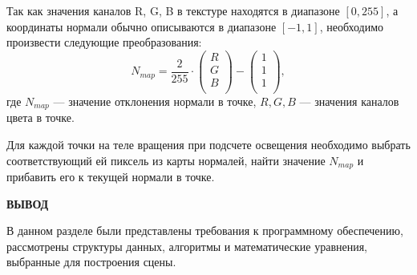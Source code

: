 Так как значения каналов R, G, B в текстуре находятся в диапазоне $[0, 255]$, а координаты нормали обычно описываются в диапазоне $[-1, 1]$, необходимо произвести следующие преобразования:
\begin{equation}
    N_{map} = \frac{2}{255} \cdot 
    \begin{pmatrix}
    R \\
    G \\
    B \\
    \end{pmatrix}
    - 
    \begin{pmatrix}
    1 \\
    1 \\
    1 \\
    \end{pmatrix},
\end{equation}
где $N_{map}$ --- значение отклонения нормали в точке, $R, G, B$ --- значения каналов цвета в точке. 

Для каждой точки на теле вращения при подсчете освещения необходимо выбрать соответствующий ей пиксель из карты нормалей, найти значение $N_{map}$ и прибавить его к текущей нормали в точке.

\textbf{ВЫВОД}

В данном разделе были представлены требования к программному обеспечению, рассмотрены структуры данных, алгоритмы и математические уравнения, выбранные для построения сцены.
\clearpage